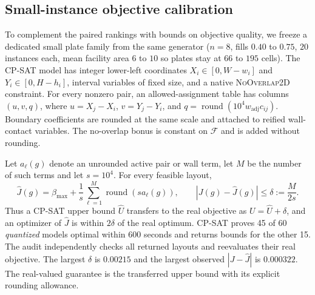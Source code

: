 \documentclass[preprint,12pt,authoryear,nonatbib]{elsarticle}
\newcommand{\cF}{\mathcal{F}}
\begin{document}
\subsection{Small-instance objective calibration}
\label{sec:results_bench}
To complement the paired rankings with bounds on objective quality, we freeze
a dedicated small plate family from the same
generator ($n=8$, fills $0.40$ to $0.75$, $20$ instances each, mean facility
area $6$ to $10$ so plates stay at $66$ to $195$ cells). The CP-SAT model
\citep{GoogleCPSAT} has
integer lower-left coordinates $X_i\in[0,W-w_i]$ and
$Y_i\in[0,H-h_i]$, interval variables of fixed size, and a native
\textsc{NoOverlap2D} constraint. For every nonzero pair, an allowed-assignment
table has columns $(u,v,q)$, where $u=X_j-X_i$, $v=Y_j-Y_i$, and
$q=\operatorname{round}(10^4 w_{\mathrm{adj}}c_{ij})$. Boundary coefficients are rounded at the
same scale and attached to reified wall-contact variables. The no-overlap bonus
is constant on $\cF$ and is added without rounding.

Let $a_\ell(g)$ denote an unrounded active pair or wall term, let $M$ be the
number of such terms and let $s=10^4$.
For every feasible layout,
\begin{equation}
 \widehat J(g)=\beta_{\max}+\frac{1}{s}
 \sum_{\ell=1}^{M}\operatorname{round}(s a_\ell(g)),
 \qquad |J(g)-\widehat J(g)|\le\delta:=\frac{M}{2s}.
\label{eq:quantbound}
\end{equation}
Thus a CP-SAT upper bound $\widehat U$ transfers to the real objective as
$U=\widehat U+\delta$, and an optimizer of $\widehat J$ is within $2\delta$ of
the real optimum. CP-SAT proves 45 of 60 \emph{quantized} models optimal within
600 seconds and returns bounds for the other 15. The audit independently checks
all returned layouts and reevaluates their real objective. The largest
$\delta$ is $0.00215$ and the largest observed $|J-\widehat J|$ is $0.000322$.
The real-valued guarantee is the transferred upper bound with its explicit
rounding allowance.
\end{document}
